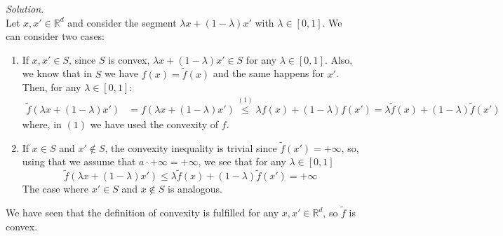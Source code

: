 \documentclass[a4paper]{article}
\newenvironment{solution}
    {\textit{Solution.}\\}
    {}
\newcommand{\R}{\mathbb R}
\begin{document}
\begin{solution}

  Let \(x,x' \in \R^d\) and consider the segment \(\lambda x + (1-\lambda)x'\) with \(\lambda \in [0,1]\). We can consider two cases:

  \begin{enumerate}
    \item If \(x,x' \in S\), since \(S\) is convex, \(\lambda x + (1-\lambda)x' \in S\) for any \(\lambda \in [0,1]\). Also, we know that in \(S\) we have \(f(x) = \tilde f(x)\) and the same happens for \(x'\). Then, for any \(\lambda \in [0,1]\):
          \begin{align*}
            \tilde f(\lambda x + (1-\lambda)x') & = f(\lambda x + (1-\lambda)x') \stackrel{(1)}{\leq}\lambda f(x) + (1-\lambda )f(x') = \lambda \tilde f(x) + (1-\lambda) \tilde f(x')
          \end{align*}
          where, in \((1)\) we have used the convexity of \(f\).

    \item If \(x \in S\) and \(x' \notin S\), the convexity inequality is trivial since \(\tilde f(x') = +\infty\), so, using that we assume that \(a \cdot +\infty = +\infty\), we see that for any \(\lambda \in [0,1]\)
          \[
            \tilde f ( \lambda x + (1-\lambda)x' ) \leq \lambda \tilde f(x) + (1-\lambda) \tilde f(x') = + \infty
          \]
          The case where \(x' \in S\) and \(x \notin S\) is analogous.
  \end{enumerate}

  We have seen that the definition of convexity is fulfilled for any \(x,x' \in \R^{d}\), so \(\tilde f\) is convex.
\end{solution}
\end{document}
